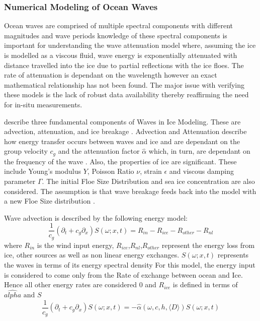 \subsubsection{Numerical Modeling of Ocean Waves}
Ocean waves are comprised of multiple spectral components with different magnitudes and wave periods knowledge of these spectral components is important for understanding the wave attenuation model \cite{williams2013wave} where, assuming the ice is modelled as a viscous fluid, wave energy is exponentially attenuated \cite{meylan2014situ}\cite{williams2013wave} with distance travelled into the ice due to partial reflections with the ice floes. The rate of attenuation is dependant on the wavelength however an exact mathematical relationship has not been found. The major issue with verifying these models is the lack of robust data availability \cite{meylan2014situ} thereby reaffirming the need for in-situ measurements.\par 
\textcite{williams2013wave} describe three fundamental components of Waves in Ice Modeling. These are advection, attenuation, and ice breakage \cite{williams2013wave}. Advection and Attenuation describe how energy transfer occurs between waves and ice and are dependant on the group velocity $c_g$ and the attenuation factor $\hat{\alpha}$ which, in turn, are dependant on the frequency of the wave \cite{williams2013wave}. Also, the properties of ice are significant. These include Young's modulus $Y$, Poisson Ratio $\nu$, strain $\epsilon$ and viscous damping parameter $\Gamma$. The initial Floe Size Distribution and sea ice concentration are also considered. The assumption is that wave breakage feeds back into the model with a new Floe Size distribution \cite{williams2013wave}. \par

Wave advection is described by the following energy model:
\begin{equation}
    \frac{1}{c_g}(\partial_t +c_g\partial_x)S(\omega;x,t) = R_{in}- R_{ice} - R_{other}- R_{nl}
\end{equation}
where $R_{in}$ is the wind input energy, $R_{ice}$,$R_{nl}$,$R_{other}$ represent the energy loss from ice, other sources as well as non linear energy exchanges. $S(\omega;x,t)$ represents the waves in terms of its energy spectral density \cite{williams2013wave} For this model, the energy input is considered to come only from the Rate of exchange between ocean and Ice. Hence all other energy rates are considered 0 and $R_{ice}$ is defined in terms of $\hat{alpha} \text{ and } S$
\begin{equation}
   \frac{1}{c_g}(\partial_t +c_g\partial_x)S(\omega;x,t)  = -\hat{\alpha}(\omega,c,h,\langle D \rangle)S(\omega;x,t)
\end{equation}

